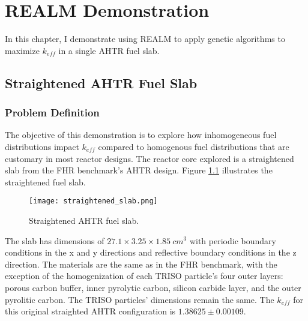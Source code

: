 \chapter{REALM Demonstration}
In this chapter, I demonstrate using \gls{REALM} to apply genetic algorithms 
to maximize $k_{eff}$ in a single \gls{AHTR} fuel slab.  

\section{Straightened AHTR Fuel Slab}
\subsection{Problem Definition}
The objective of this demonstration is to explore how inhomogeneous fuel 
distributions impact $k_{eff}$ compared to homogenous fuel distributions that 
are customary in most reactor designs. 
The reactor core explored is a straightened slab from the \gls{FHR} benchmark's
\gls{AHTR} design.
Figure \ref{fig:straightened_slab} illustrates the straightened fuel slab. 
\begin{figure}[]
    \centering
    \texttt{[image: straightened\_slab.png]}
    \raggedright
    \caption{Straightened \acrfull{AHTR} fuel slab.}
    \label{fig:straightened_slab}
\end{figure}
The slab has dimensions of $27.1 \times 3.25 \times 1.85\ cm^3$
with periodic boundary conditions in the x and y directions and reflective 
boundary conditions in the z direction. 
The materials are the same as in the \gls{FHR} benchmark, with the exception 
of the homogenization of each \gls{TRISO} particle's four outer layers: 
porous carbon buffer, inner pyrolytic carbon, silicon carbide layer, and the 
outer pyrolitic carbon. 
The \gls{TRISO} particles' dimensions remain the same.
The $k_{eff}$ for this original straighted \gls{AHTR} configuration is 
$1.38625 \pm 0.00109$. 

